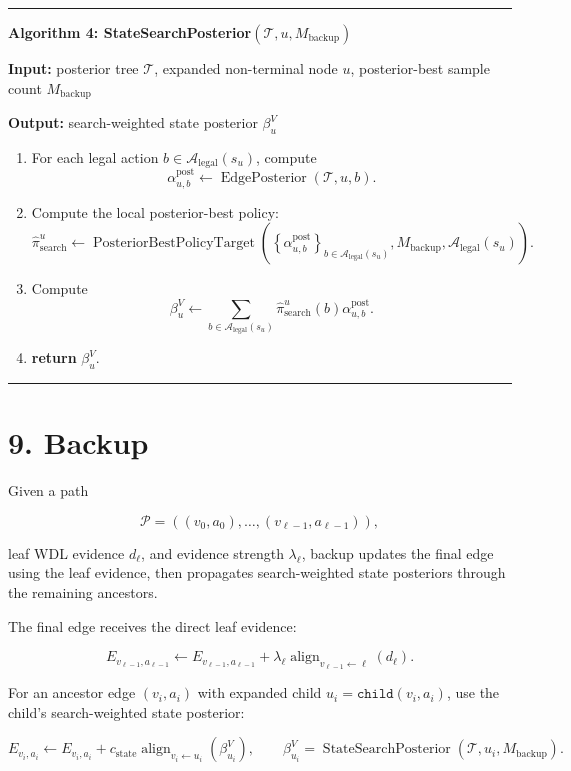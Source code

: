 \documentclass[11pt]{article}
\newcommand{\Tree}{\mathcal{T}}
\newcommand{\Path}{\mathcal{P}}
\newcommand{\Legal}{\mathcal{A}_{\mathrm{legal}}}
\newcommand{\Align}{\operatorname{align}}
\newcommand{\EdgePosterior}{\operatorname{EdgePosterior}}
\newcommand{\StateSearchPosterior}{\operatorname{StateSearchPosterior}}
\newcommand{\PosteriorBestPolicyTarget}{\operatorname{PosteriorBestPolicyTarget}}
\newenvironment{algorithmblock}[1]
{
  \par\medskip
  \noindent\hrule\par\smallskip
  \noindent\textbf{#1}
  \par\smallskip
}
{
  \par\smallskip\noindent\hrule\par\medskip
}
\newcommand{\Input}{\textbf{Input: }}
\newcommand{\Output}{\textbf{Output: }}
\newcommand{\Return}{\textbf{return }}
\begin{document}
\begin{algorithmblock}{Algorithm 4: StateSearchPosterior\((\Tree,u,M_{\mathrm{backup}})\)}

\Input posterior tree \(\Tree\), expanded non-terminal node \(u\), posterior-best sample count \(M_{\mathrm{backup}}\)

\Output search-weighted state posterior \(\beta^V_u\)

\begin{enumerate}[leftmargin=2em]
  \item For each legal action \(b\in\Legal(s_u)\), compute
  \[
  \alpha^{\mathrm{post}}_{u,b}
  \gets
  \EdgePosterior(\Tree,u,b).
  \]

  \item Compute the local posterior-best policy:
  \[
  \hat\pi_{\mathrm{search}}^u
  \gets
  \PosteriorBestPolicyTarget
  \left(
  \left\{\alpha^{\mathrm{post}}_{u,b}\right\}_{b\in\Legal(s_u)},
  M_{\mathrm{backup}},
  \Legal(s_u)
  \right).
  \]

  \item Compute
  \[
  \beta^V_u
  \gets
  \sum_{b\in\Legal(s_u)}
  \hat\pi_{\mathrm{search}}^u(b)
  \alpha^{\mathrm{post}}_{u,b}.
  \]

  \item \Return \(\beta^V_u\).
\end{enumerate}

\end{algorithmblock}

\section*{9. Backup}

Given a path

\[
\Path=((v_0,a_0),\ldots,(v_{\ell-1},a_{\ell-1})),
\]

leaf WDL evidence \(d_\ell\), and evidence strength \(\lambda_\ell\), backup
updates the final edge using the leaf evidence, then propagates search-weighted
state posteriors through the remaining ancestors.

The final edge receives the direct leaf evidence:

\[
E_{v_{\ell-1},a_{\ell-1}}
\gets
E_{v_{\ell-1},a_{\ell-1}}
+
\lambda_\ell
\Align_{v_{\ell-1}\leftarrow \ell}(d_\ell).
\]

For an ancestor edge \((v_i,a_i)\) with expanded child \(u_i=\texttt{child}(v_i,a_i)\),
use the child's search-weighted state posterior:

\[
E_{v_i,a_i}
\gets
E_{v_i,a_i}
+
 c_{\mathrm{state}}
\Align_{v_i\leftarrow u_i}
\left(
\beta^V_{u_i}
\right),
\qquad
\beta^V_{u_i}=\StateSearchPosterior(\Tree,u_i,M_{\mathrm{backup}}).
\]
\end{document}

